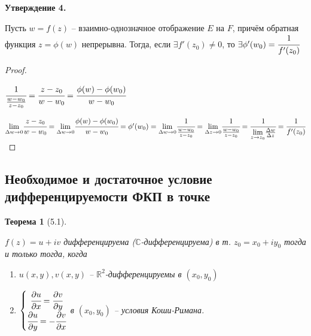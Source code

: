 \documentclass[draft]{article}
\newcommand{\forcenewline}{$\phantom{\mbox{newline}}$\newline}
\newcommand{\dd}{\partial}
\newcommand{\R}{\mathbb{R}}
\renewcommand{\C}{\mathbb{C}}
\newcommand{\mlim}[1]{\underset{#1}{\lim}}
\renewcommand{\f}{\phi}
\newcommand{\D}{\Delta}
\newcommand{\sys}[1]{\left\{\begin{matrix}#1\end{matrix}\right.}
\newtheorem*{theor}{Теорема}
\theoremstyle{remark}
\begin{document}
{\bfseries Утверждение 4.}

Пусть $w=f(z)$ -- взаимно-однозначное отображение $E$ на $F$, причём обратная функция $z=\phi(w)$ непрерывна. Тогда, если $\exists f'(z_0)\neq0$, то $\exists \phi'(w_0)=\cfrac{1}{f'(z_0)}$

\begin{proof}
\forcenewline

$\cfrac{1}{\frac{w-w_0}{z-z_0}}=\cfrac{z-z_0}{w-w_0}=\cfrac{\f(w)-\f(w_0)}{w-w_0}$

$\mlim{\D w\to 0}\cfrac{z-z_0}{w-w_0}=\mlim{\D w\to0}\cfrac{\f(w)-\f(w_0)}{w-w_0}=\f'(w_0)=\mlim{\D w\to0}\cfrac{1}{\frac{w-w_0}{z-z_0}}=\mlim{\D z\to0}\cfrac{1}{\frac{w-w_0}{z-z_0}}=\cfrac{1}{\mlim{z\to z_0}\frac{\D w}{\D z}}=\cfrac{1}{f'(z_0)}$
\end{proof}

\subsection{Необходимое и достаточное условие дифференцируемости ФКП в точке}

\begin{theor}[5.1]
\forcenewline

$f(z)=u+iv$ дифференцируема ($\C$-дифференцируема) в т. $z_0=x_0+iy_0$ тогда и только тогда, когда \begin{enumerate}
\item $u(x,y),v(x,y)$ -- $\R^2$-дифференцируемы в $(x_0,y_0)$
\item $\sys{\cfrac{\dd u}{\dd x}=\cfrac{\dd v}{\dd y} \\ \cfrac{\dd u}{\dd y}=-\cfrac{\dd v}{\dd x}}$ в $(x_0,y_0)$ -- условия Коши-Римана.
\end{enumerate}
\end{theor}
\end{document}
